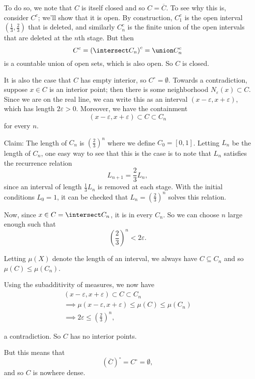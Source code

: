 \begin{solution}
\begin{enumerate}
    To do so, we note that $C$ is itself closed and so $C = \overline C$. To see why this is, consider $C^c$; we'll show that it is open. By construction, $C_1^c$ is the open interval $(\frac 1 3, \frac 2 3)$ that is deleted, and similarly $C_n^c$ is the finite union of the open intervals that are deleted at the $n$th stage. But then
    $$
    C^c = \left(\intersect C_n \right)^c = \union C_n^c
    $$
    is a countable union of open sets, which is also open. So $C$ is closed.

    It is also the case that $C$ has empty interior, so $C^\circ = \emptyset$. Towards a contradiction, suppose $x\in C$ is an interior point; then there is some neighborhood $N_\varepsilon(x) \subset C$. Since we are on the real line, we can write this as an interval $(x-\varepsilon, x+\varepsilon)$, which has length $2\varepsilon > 0$. Moreover, we have the containment
    $$
    (x-\varepsilon, x+ \varepsilon) \subset C \subset C_n
    $$
    for every $n$.

    Claim: The length of $C_n$ is $(\frac 2 3)^n$ where we define $C_0 = [0, 1]$. Letting $L_n$ be the length of $C_n$, one easy way to see that this is the case is to note that $L_n$ satisfies the recurrence relation
    $$
    L_{n+1} = \frac2 3 L_n,
    $$
    since an interval of length $\frac 1 3 L_n$ is removed at each stage. With the initial conditions $L_0 = 1$, it can be checked that $L_n = \left( \frac 2 3 \right)^n$ solves this relation.

    Now, since $x\in C = \intersect C_n$, it is in every $C_n$. So we can choose $n$ large enough such that
    $$
    \left( \frac 2 3 \right)^n < 2\varepsilon.
    $$

    Letting $\mu(X)$ denote the length of an interval, we always have $C \subseteq C_n$ and so $\mu(C) \leq \mu(C_n)$.

    Using the subadditivity of measures, we now have
    \begin{align*}
    (x-\varepsilon, x+ \varepsilon) \subset C \subset C_n \\
    \implies \mu(x-\varepsilon, x+ \varepsilon) \leq \mu(C) \leq \mu(C_n) \\
    \implies 2\varepsilon \leq \left( \frac 2 3 \right)^n,
    \end{align*}

    a contradiction. So $C$ has no interior points.

    But this means that
    $$
    (\overline C)^\circ = C^\circ = \emptyset,
    $$
    and so $C$ is nowhere dense.


\end{enumerate}
\end{solution}

